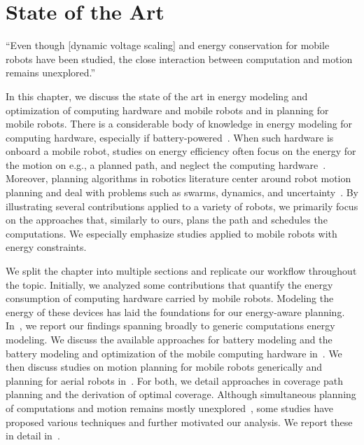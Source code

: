 %
%
%
%
\chapter{State of the Art}
\label{cp:soa}

\begin{chapquote}{\cite{brateman2006energy}}
  ``Even though [dynamic voltage scaling] and energy conservation for mobile robots have been studied, the close interaction between computation and motion remains unexplored.''
\end{chapquote}

\vspace*{1em}

In this chapter, we discuss the state of the art in energy modeling and optimization of computing hardware and mobile robots and in planning for mobile robots. There is a considerable body of knowledge in energy modeling for computing hardware, especially if battery-powered~\citep{rao2005battery}. When such hardware is onboard a mobile robot, studies on energy efficiency often focus on the energy for the motion on e.g., a planned path, and neglect the computing hardware~\citep{ondruska2015scheduled}. Moreover, planning algorithms in robotics literature center around robot motion planning and deal with problems such as swarms, dynamics, and uncertainty~\citep{lavalle2006planning}. By illustrating several contributions applied to a variety of robots, we primarily focus on the approaches that, similarly to ours, plans the path and schedules the computations. We especially emphasize studies applied to mobile robots with energy constraints.

We split the chapter into multiple sections and replicate our workflow throughout the topic. Initially, we analyzed some contributions that quantify the energy consumption of computing hardware carried by mobile robots. Modeling the energy of these devices has laid the foundations for our energy-aware planning. In~, we report our findings spanning broadly to generic computations energy modeling. We discuss the available approaches for battery modeling and the battery modeling and optimization of the mobile computing hardware in~. We then discuss studies on motion planning for mobile robots generically and planning for aerial robots in~. For both, we detail approaches in coverage path planning and the derivation of optimal coverage. Although simultaneous planning of computations and motion remains mostly unexplored~\citep{brateman2006energy,ondruska2015scheduled,sudhakar2020balancing}, some studies have proposed various techniques and further motivated our analysis. We report these in detail in~.


